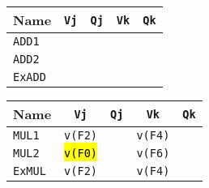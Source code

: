 \begin{enumerate}
    \begin{minipage}[t]{0.43\textwidth}
        \centering
        \begin{adjustbox}{width={\textwidth},totalheight={\textheight},keepaspectratio}
            \begin{tabular}{@{} l | c c c c @{}}
                \toprule
                Name            & \texttt{Vj}           & \texttt{Qj}                       & \texttt{Vk}           & \texttt{Qk}           \\
                \midrule
                \texttt{ADD1}   &                       &                                   &                       &                       \\ [.3em]
                \texttt{ADD2}   &                       &                                   &                       &                       \\
                \cmidrule{1-5}
                \texttt{ExADD}  &                       &                                   &                       &                       \\
                \bottomrule
            \end{tabular}
        \end{adjustbox}
    \end{minipage}
    \hfill
    \begin{minipage}[t]{0.43\textwidth}
        \centering
        \begin{adjustbox}{width={\textwidth},totalheight={\textheight},keepaspectratio}
            \begin{tabular}{@{} l | c c c c @{}}
                \toprule
                Name            & \texttt{Vj}           & \texttt{Qj}           & \texttt{Vk}           & \texttt{Qk}   \\
                \midrule
                \texttt{MUL1}   & \texttt{v(F2)}        &                       & \texttt{v(F4)}        &               \\ [.3em]
                \texttt{MUL2}   & \hl{\texttt{v(F0)}}   &                       & \texttt{v(F6)}        &               \\
                \cmidrule{1-5}
                \texttt{ExMUL}  & \texttt{v(F2)}        &                       & \texttt{v(F4)}        &               \\
                \bottomrule
            \end{tabular}
        \end{adjustbox}
    \end{minipage}


\end{enumerate}
